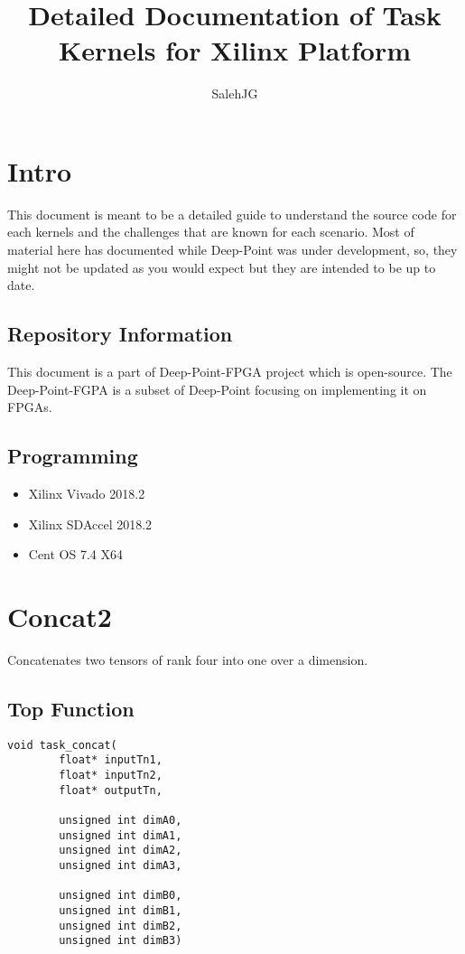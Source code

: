 \documentclass[•]{article}
\title{Detailed Documentation of Task Kernels for Xilinx Platform}
\author{SalehJG}
\begin{document}
\maketitle

\section{Intro}
This document is meant to be a detailed guide to understand the source code for each kernels and the challenges that are known for each scenario.
Most of material here has documented while Deep-Point was under development, so, they might not be updated as you would expect but they are intended to be up to date.

\subsection{Repository Information}
This document is a part of Deep-Point-FPGA project which is open-source. The Deep-Point-FGPA is a subset of Deep-Point focusing on implementing it on FPGAs.

\subsection{Programming}
\begin{itemize}
\item Xilinx Vivado 2018.2
\item Xilinx SDAccel 2018.2
\item Cent OS 7.4 X64
\end{itemize}

\pagebreak

\section{Concat2}
Concatenates two tensors of rank four into one over a dimension.
\subsection{Top Function}
\begin{lstlisting}
void task_concat(
		float* inputTn1,
	    float* inputTn2,
	    float* outputTn,

		unsigned int dimA0,
		unsigned int dimA1,
		unsigned int dimA2,
		unsigned int dimA3,

		unsigned int dimB0,
		unsigned int dimB1,
		unsigned int dimB2,
		unsigned int dimB3)
\end{lstlisting}
\end{document}
